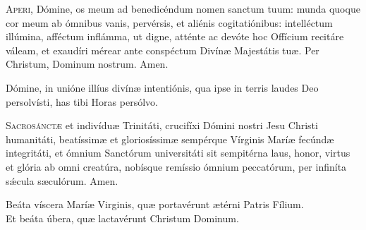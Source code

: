 \documentclass[a4paper, twoside, 12pt]{article}
\begin{document}
\lettrine{{\color{red}A}}{peri,} Dómine, os meum ad benedicéndum nomen sanctum tuum:
munda quoque cor meum ab ómnibus vanis, pervérsis, et aliénis
cogitatiónibus:
intelléctum illúmina, afféctum inflámma,
ut digne, atténte ac devóte hoc Offícium recitáre váleam,
et exaudíri mérear ante conspéctum Divínæ Majestátis tuæ.
Per Christum, Dominum nostrum.
\Rbardot{} Amen.

Dómine, in unióne illíus divínæ intentiónis,
qua ipse in terris laudes Deo persolvísti,
has tibi Horas  persólvo.

\vfill



\lettrine{{\color{red}S}}{acrosánctæ} et indivíduæ Trinitáti,
crucifíxi Dómini nostri Jesu Christi humanitáti,
beatíssimæ et gloriosíssimæ sempérque Vírginis Maríæ
fecúndæ integritáti, 
et ómnium Sanctórum universitáti
sit sempitérna laus, honor, virtus et glória
ab omni creatúra,
nobísque remíssio ómnium peccatórum,
per infiníta sǽcula sæculórum.
\Rbardot{} Amen.

\noindent \Vbardot{} Beáta víscera Maríæ Virginis, quæ portavérunt
ætérni Patris Fílium.\\
\Rbardot{} Et beáta úbera, quæ lactavérunt Christum Dominum.


\vfill


\cantusSineNeumas

\label{deusinadiutorium}


\vfill
\pagebreak

\cantusCumNeumis



\trAntI

\cantusSineNeumas


\end{document}
